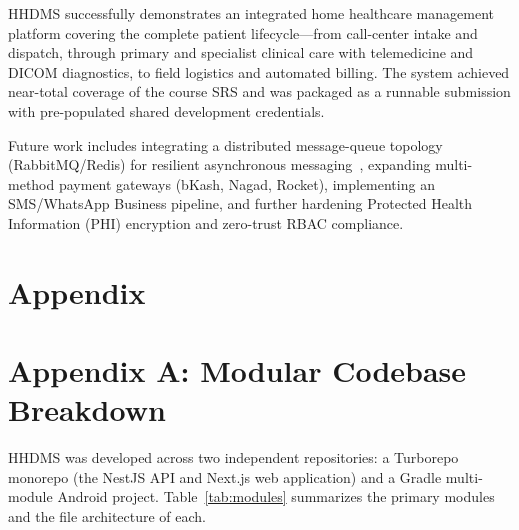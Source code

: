 \documentclass[conference]{IEEEtran}
\begin{document}
HHDMS successfully demonstrates an integrated home healthcare management platform covering the complete patient lifecycle---from call-center intake and dispatch, through primary and specialist clinical care with telemedicine and DICOM diagnostics, to field logistics and automated billing. The system achieved near-total coverage of the course SRS and was packaged as a runnable submission with pre-populated shared development credentials.

Future work includes integrating a distributed message-queue topology (RabbitMQ/Redis) for resilient asynchronous messaging~\cite{catovic2022microservice}, expanding multi-method payment gateways (bKash, Nagad, Rocket), implementing an SMS/WhatsApp Business pipeline, and further hardening Protected Health Information (PHI) encryption and zero-trust RBAC compliance.




\newpage
\onecolumn
\section*{Appendix}
\renewcommand{\thefigure}{\thesection-\arabic{figure}}

\section*{Appendix A: Modular Codebase Breakdown}

HHDMS was developed across two independent repositories: a Turborepo monorepo (the NestJS API and Next.js web application) and a Gradle multi-module Android project. Table~\ref{tab:modules} summarizes the primary modules and the file architecture of each.
\end{document}
